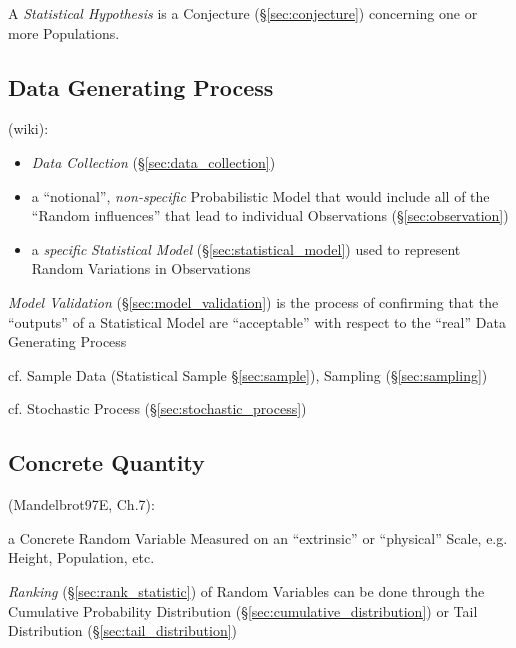 A \emph{Statistical Hypothesis} is a Conjecture (\S\ref{sec:conjecture})
concerning one or more Populations.



\subsection{Data Generating Process}\label{sec:data_generating_process}

(wiki):

\begin{itemize}
  \item \emph{Data Collection} (\S\ref{sec:data_collection})
  \item a ``notional'', \emph{non-specific} Probabilistic Model
    that would include all of the ``Random influences'' that lead to individual
    Observations (\S\ref{sec:observation})
  \item a \emph{specific} \emph{Statistical Model}
    (\S\ref{sec:statistical_model}) used to represent Random Variations in
    Observations
\end{itemize}

\fist \emph{Model Validation} (\S\ref{sec:model_validation}) is the process of
confirming that the ``outputs'' of a Statistical Model are ``acceptable'' with
respect to the ``real'' Data Generating Process

\fist cf. Sample Data (Statistical Sample \S\ref{sec:sample}), Sampling
(\S\ref{sec:sampling})

\fist cf. Stochastic Process (\S\ref{sec:stochastic_process})



\subsection{Concrete Quantity}\label{sec:concrete_quantity}

(Mandelbrot97E, Ch.7):

a Concrete Random Variable Measured on an ``extrinsic'' or ``physical'' Scale,
e.g. Height, Population, etc.

\emph{Ranking} (\S\ref{sec:rank_statistic}) of Random Variables can be done
through the Cumulative Probability Distribution
(\S\ref{sec:cumulative_distribution}) or Tail Distribution
(\S\ref{sec:tail_distribution})

